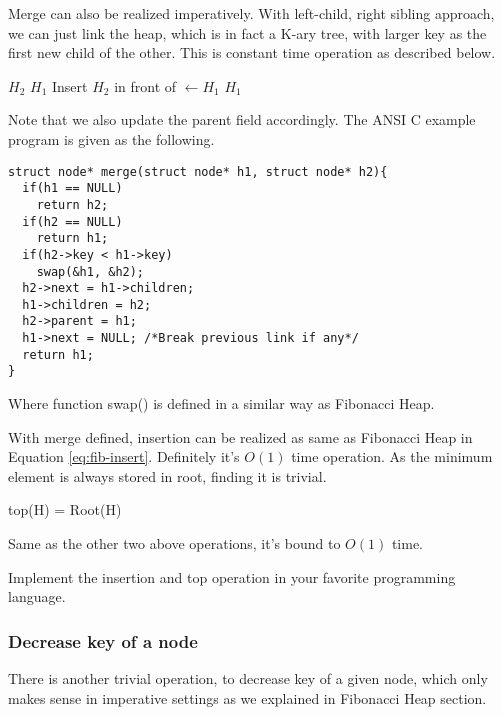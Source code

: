 \documentclass{article}
\begin{document}
Merge can also be realized imperatively. With left-child, right
sibling approach, we can just link the heap, which is in fact a
K-ary tree, with larger key as the first new child of the other.
This is constant time operation as described below.

\begin{algorithmic}[1]
    \State \Return $H_2$
  \EndIf
    \State \Return $H_1$
  \EndIf
    \State {}
  \EndIf
  \State Insert $H_2$ in front of 
  \State {} $\gets H_1$
  \State \Return $H_1$
\EndFunction
\end{algorithmic}

Note that we also update the parent field accordingly. The ANSI C
example program is given as the following.

\lstset{language=C}
\begin{lstlisting}
struct node* merge(struct node* h1, struct node* h2){
  if(h1 == NULL)
    return h2;
  if(h2 == NULL)
    return h1;
  if(h2->key < h1->key)
    swap(&h1, &h2);
  h2->next = h1->children;
  h1->children = h2;
  h2->parent = h1;
  h1->next = NULL; /*Break previous link if any*/
  return h1;
}
\end{lstlisting}

Where function swap() is defined in a similar way as Fibonacci Heap.

With merge defined, insertion can be realized as same as Fibonacci Heap 
in Equation \ref{eq:fib-insert}. Definitely it's $O(1)$ time operation.
As the minimum element is always stored in root, finding it is trivial.

\be
top(H) = Root(H)
\ee

Same as the other two above operations, it's bound to $O(1)$ time.

\begin{Exercise}
Implement the insertion and top operation in your favorite programming
language.
\end{Exercise}

\subsubsection{Decrease key of a node}
There is another trivial operation, to decrease key of a given node,
which only makes sense in imperative settings as we explained in Fibonacci
Heap section.
\end{document}
